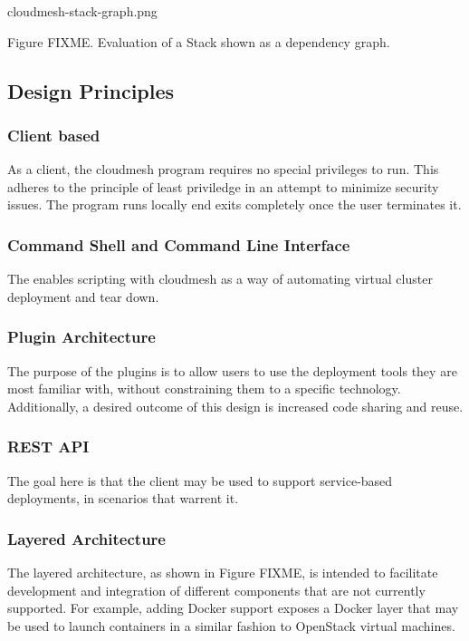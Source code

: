 \documentclass[9pt,twocolumn,twoside]{styles/osajnl}
\begin{document}
 cloudmesh-stack-graph.png 

Figure FIXME. Evaluation of a Stack shown as a dependency graph.


\subsection{Design Principles}

\subsubsection{Client based}

As a client, the cloudmesh program requires no special privileges to run. This adheres to the principle of least priviledge in an attempt to minimize security issues. The program runs locally end exits completely once the user terminates it.


\subsubsection{Command Shell and Command Line Interface}

The enables scripting with cloudmesh as a way of automating virtual cluster deployment and tear down.


\subsubsection{Plugin Architecture}

The purpose of the plugins is to allow users to use the deployment tools they are most familiar with, without constraining them to a specific technology. Additionally, a desired outcome of this design is increased code sharing and reuse.


\subsubsection{REST API}

The goal here is that the client may be used to support service-based deployments, in scenarios that warrent it.


\subsubsection{Layered Architecture}

The layered architecture, as shown in Figure FIXME, is intended to facilitate development and integration of different components that are not currently supported. For example, adding Docker support exposes a Docker layer that may be used to launch containers in a similar fashion to OpenStack virtual machines.
\end{document}
